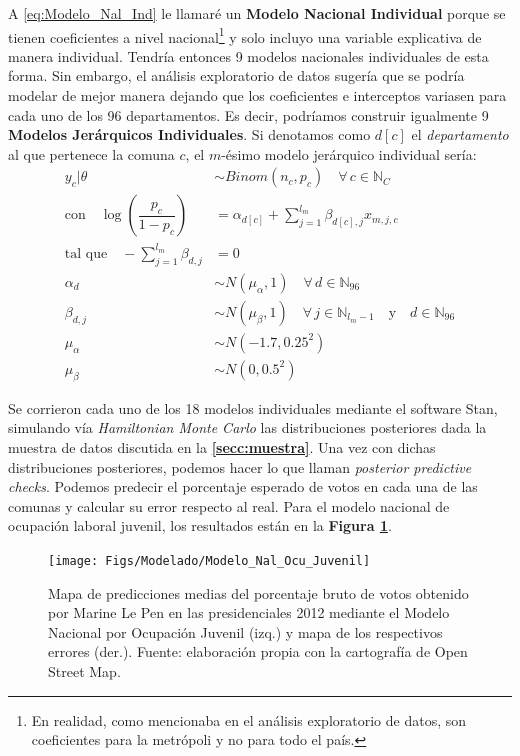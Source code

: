 A \eqref{eq:Modelo_Nal_Ind} le llamaré un \textbf{Modelo Nacional Individual} porque se tienen coeficientes a nivel nacional\footnote{En realidad, como mencionaba en el análisis exploratorio de datos, son coeficientes para la metrópoli y no para todo el país.} y solo incluyo una variable explicativa de manera individual. Tendría entonces 9 modelos nacionales individuales de esta forma. Sin embargo, el análisis exploratorio de datos sugería que se podría modelar de mejor manera dejando que los coeficientes e interceptos variasen para cada uno de los 96 departamentos. Es decir, podríamos construir igualmente 9 \textbf{Modelos Jerárquicos Individuales}. Si denotamos como $d[c]$ el \textit{departamento} al que pertenece la comuna $c$, el $m$-ésimo modelo jerárquico individual sería: 
\begin{align}\label{eq:Modelo_Jer_Ind}
y_c|\theta & \sim Binom(n_c,p_c) \quad \forall \, c \in \mathbb{N}_C \nonumber \\
\text{con} \quad \log\left(\dfrac{p_c}{1-p_c}\right) &= \alpha_{d[c]} + \sum\limits_{j=1}^{l_m} \beta_{d[c],j} x_{m,j,c} \nonumber\\ 
\text{tal que} \quad -\sum\limits_{j = 1}^{l_m} \beta_{d,j} &= 0 \nonumber \\
\alpha_d & \sim N(\mu_{\alpha}, 1) \quad \forall \, d \in \mathbb{N}_{96} \nonumber \\
\beta_{d,j} & \sim N(\mu_{\beta}, 1) \quad \forall \, j \in \mathbb{N}_{l_m-1}  \quad \text{y} \quad d \in \mathbb{N}_{96} \nonumber \\
\mu_{\alpha} &\sim N(-1.7, 0.25^2) \nonumber \\
\mu_{\beta} &\sim N(0,0.5^2)
\end{align}

Se corrieron cada uno de los 18 modelos individuales mediante el software Stan, simulando vía \textit{Hamiltonian Monte Carlo} las distribuciones posteriores dada la muestra de datos discutida en la \textbf{\autoref{secc:muestra}}. Una vez con dichas distribuciones posteriores, podemos hacer lo que \textcite{Gelman13} llaman \textit{posterior predictive checks}. Podemos predecir el porcentaje esperado de votos en cada una de las comunas y calcular su error respecto al real. Para el modelo nacional de ocupación laboral juvenil, los resultados están en la \textbf{Figura \ref{fig:Modelo_Nal_Ocu_Juvenil}}.\\

\begin{figure}[h]
	\centering
	\texttt{[image: Figs/Modelado/Modelo\_Nal\_Ocu\_Juvenil]}
	\caption{Mapa de predicciones medias del porcentaje bruto de votos obtenido por Marine Le Pen en las presidenciales 2012 mediante el Modelo Nacional por Ocupación Juvenil (izq.) y mapa de los respectivos errores (der.). Fuente: elaboración propia con la cartografía de Open Street Map.}
	\label{fig:Modelo_Nal_Ocu_Juvenil}
\end{figure}

